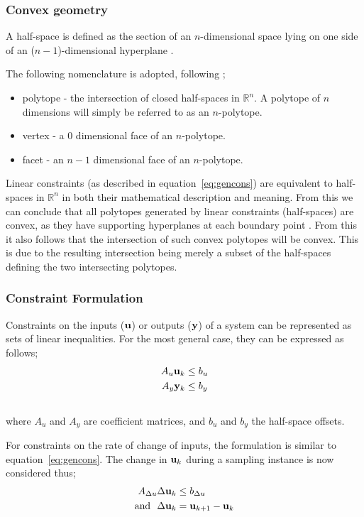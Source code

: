 \documentclass[final,authoryear,5pt,times,twocolumn]{elsarticle}
\newcommand{\vect}[1] %
{{\bf {#1}}}
\newcommand{\npoly}{$n$-polytope}
\begin{document}
\subsubsection{Convex geometry}
A half-space is defined as the section of an $n$-dimensional space lying on one side of an ($n-1$)-dimensional hyperplane \citep[1282]{crcmaths}.

The following nomenclature is adopted, following \citet[487]{bayerlee};
\begin{itemize}
\item polytope - the intersection of closed half-spaces in $\mathbb{R}^n$.
A polytope of $n$ dimensions will simply be referred to as an $n$-polytope.
\item vertex - a 0 dimensional face of an \npoly.
\item facet - an $n-1$ dimensional face of an \npoly.
\end{itemize}

Linear constraints (as described in equation~\ref{eq:gencons}) are equivalent to half-spaces in $\mathbb{R}^n$ in both their mathematical description and meaning.
From this we can conclude that all polytopes generated by linear constraints (half-spaces) are convex, as they have supporting hyperplanes at each boundary point \citep[21]{manilev}.
From this it also follows that the intersection of such convex polytopes will be convex.
This is due to the resulting intersection being merely a subset of the half-spaces defining the two intersecting polytopes.

\subsubsection{Constraint Formulation}
Constraints on the inputs ($\vect{u}$) or outputs ($\vect{y}$) of a system can be represented as sets of linear inequalities.
For the most general case, they can be expressed as follows;
\begin{align}
  \label{eq:gencons}
  A_u\vect{u}_k &\leq b_u \\ \notag
  A_y\vect{y}_k &\leq b_y \\ \notag
\end{align}
where $A_u$ and $A_y$ are coefficient matrices, and $b_u$ and $b_y$  the half-space offsets.

For constraints on the rate of change of inputs, the formulation is similar to equation~\ref{eq:gencons}.
The change in $\vect{u}_k$ during a sampling instance is now considered thus;
\begin{align*}
  A_{\Delta u}\Delta \vect{u}_k &\leq b_{\Delta u} \notag \\
  \text{and}~~ \Delta \vect{u}_k &= \vect{u}_{k+1}-\vect{u}_k
\end{align*}
\end{document}
